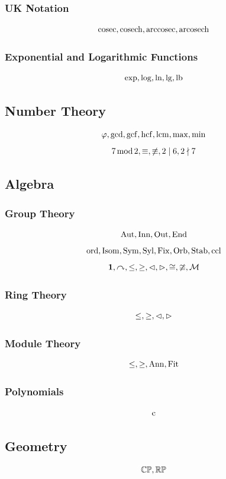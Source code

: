 \documentclass{article}
\begin{document}
\subsubsection{UK Notation}
\[
    \operatorname{cosec}, \operatorname{cosech}, \operatorname{arccosec}, \operatorname{arcosech}
\]

\subsubsection{Exponential and Logarithmic Functions}
\[
    \exp, \log, \ln, \lg, \operatorname{lb}
\]

\subsection{Number Theory}
\[
    \varphi, \gcd, \operatorname{gcf}, \operatorname{hcf}, \operatorname{lcm}, \max, \min
\]
\[
    7 \operatorname{mod} 2, \equiv, \not\equiv, 2 \mid 6, 2 \nmid 7
\]

\subsection{Algebra}

\subsubsection{Group Theory}
\[
    \operatorname{Aut}, \operatorname{Inn}, \operatorname{Out}, \operatorname{End}
\]
\[
    \operatorname{ord}, \operatorname{Isom}, \operatorname{Sym}, \operatorname{Syl}, \operatorname{Fix}, \operatorname{Orb}, \operatorname{Stab}, \operatorname{ccl}
\]
\[
    \mathbf{1}, \curvearrowright, \leq, \geq, \lhd, \rhd, \cong, \ncong, \mathcal{M}
\]

\subsubsection{Ring Theory}
\[
    \leq, \geq, \lhd, \rhd
\]  

\subsubsection{Module Theory}
\[
    \leq, \geq, \operatorname{Ann}, \operatorname{Fit}
\]

\subsubsection{Polynomials}
\[
    \operatorname{c}
\]

\subsection{Geometry}
\[
    \mathbb{C}\mathbb{P}, \mathbb{R}\mathbb{P}
\]
\end{document}
